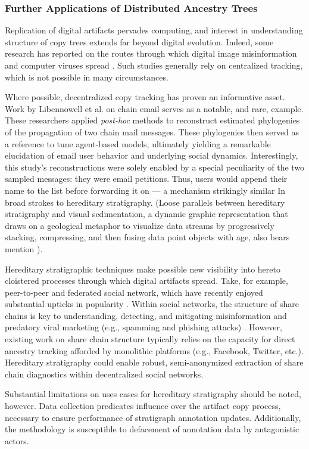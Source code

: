 \subsubsection{Further Applications of Distributed Ancestry Trees}

Replication of digital artifacts pervades computing, and interest in understanding structure of copy trees extends far beyond digital evolution.
Indeed, some research has reported on the routes through which digital image misinformation and computer viruses spread \citep{friggeri2014rumor,cohen1987computer}.
Such studies generally rely on centralized tracking, which is not possible in many circumstances.

Where possible, decentralized copy tracking has proven an informative asset.
Work by Libennowell et al. on chain email serves as a notable, and rare, example.
These researchers applied \textit{post-hoc} methods to reconstruct estimated phylogenies of the propagation of two chain mail messages.
These phylogenies then served as a reference to tune agent-based models, ultimately yielding a remarkable elucidation of email user behavior and underlying social dynamics.
Interestingly, this study's reconstructions were solely enabled by a special peculiarity of the two sampled messages: they were email petitions.
Thus, users would append their name to the list before forwarding it on --- a mechanism strikingly similar In broad strokes to hereditary stratigraphy.
(Loose parallels between hereditary stratigraphy and visual sedimentation, a dynamic graphic representation that draws on a geological metaphor to visualize data streams by progressively stacking, compressing, and then fusing data point objects with age, also bears mention \citep{huron2013visual}).

Hereditary stratigraphic techniques make possible new visibility into hereto cloistered processes through which digital artifacts spread.
Take, for example, peer-to-peer and federated social network, which have recently enjoyed substantial upticks in popularity \citep{la2021understanding}.
Within social networks, the structure of share chains is key to understanding, detecting, and mitigating misinformation \citep{kucharski2016study,raponi2022fake} and predatory viral marketing (e.g., spamming and phishing attacks) \citep{guidi2018managing}.
However, existing work on share chain structure typically relies on the capacity for direct ancestry tracking afforded by monolithic platforms (e.g., Facebook, Twitter, etc.).
Hereditary stratigraphy could enable robust, semi-anonymized extraction of share chain diagnostics within decentralized social networks.

Substantial limitations on uses cases for hereditary stratigraphy should be noted, however.
Data collection predicates influence over the artifact copy process, necessary to ensure performance of stratigraph annotation updates.
Additionally, the methodology is susceptible to defacement of annotation data by antagonistic actors.
